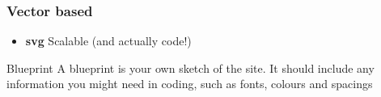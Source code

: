\subsubsection{Vector based}

\begin{itemize}
    \item \textbf{svg} Scalable (and actually code!)
\end{itemize}

\begin{infobox}{Blueprint}
    A blueprint is your own sketch of the site. It should include any information you might need in coding, such as fonts, colours and spacings
\end{infobox}

